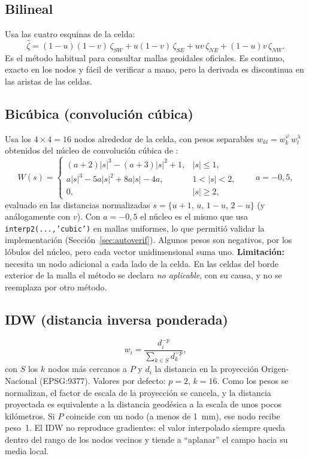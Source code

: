 \documentclass[11pt,letterpaper]{article}
\begin{document}
\subsection{Bilineal}
Usa las cuatro esquinas de la celda:
\begin{equation}
\hat\zeta = (1-u)(1-v)\,\zeta_{SW} + u(1-v)\,\zeta_{SE} + uv\,\zeta_{NE} + (1-u)v\,\zeta_{NW}.
\label{eq:bilineal}
\end{equation}
Es el método habitual para consultar mallas geoidales oficiales. Es continuo, exacto en
los nodos y fácil de verificar a mano, pero la derivada es discontinua en las aristas
de las celdas.

\subsection{Bicúbica (convolución cúbica)}
Usa los $4\times4=16$ nodos alrededor de la celda, con pesos separables
$w_{kl}=w^{\varphi}_k\,w^{\lambda}_l$ obtenidos del núcleo de convolución cúbica de
\citet{keys1981}:
\begin{equation}
W(s)=\begin{cases}
(a+2)|s|^3-(a+3)|s|^2+1, & |s|\le1,\\
a|s|^3-5a|s|^2+8a|s|-4a, & 1<|s|<2,\\
0, & |s|\ge2,
\end{cases}
\qquad a=-0{,}5,
\label{eq:keys}
\end{equation}
evaluado en las distancias normalizadas $s=\{u+1,\,u,\,1-u,\,2-u\}$ (y análogamente con
$v$). Con $a=-0{,}5$ el núcleo es el mismo que usa \texttt{interp2(...,'cubic')} en mallas
uniformes, lo que permitió validar la implementación (Sección~\ref{sec:autoverif}). Algunos
pesos son negativos, por los lóbulos del núcleo, pero cada vector unidimensional suma uno.
\textbf{Limitación:} necesita un nodo adicional a cada lado de la celda. En las celdas del
borde exterior de la malla el método se declara \emph{no aplicable}, con su causa, y no se
reemplaza por otro método.

\subsection{IDW (distancia inversa ponderada)}
\begin{equation}
w_i=\frac{d_i^{-p}}{\sum_{k\in S}d_k^{-p}},
\label{eq:idw}
\end{equation}
con $S$ los $k$ nodos más cercanos a $P$ y $d_i$ la distancia en la proyección
Origen-Nacional (EPSG:9377). Valores por defecto: $p=2$, $k=16$. Como los pesos se
normalizan, el factor de escala de la proyección se cancela, y la distancia proyectada es
equivalente a la distancia geodésica a la escala de unos pocos kilómetros. Si $P$ coincide
con un nodo (a menos de \SI{1}{mm}), ese nodo recibe peso~1. El IDW no reproduce gradientes:
el valor interpolado siempre queda dentro del rango de los nodos vecinos y tiende a
``aplanar'' el campo hacia su media local.
\end{document}
